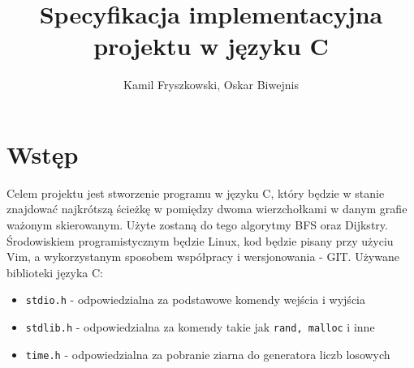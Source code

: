 \documentclass{article}
\title{Specyfikacja implementacyjna projektu w języku C}
\author{Kamil Fryszkowski, Oskar Biwejnis}
\begin{document}
\maketitle
\thispagestyle{fancy}
\section{Wstęp}
Celem projektu jest stworzenie programu w języku C, który będzie w stanie znajdować najkrótszą ścieżkę w pomiędzy dwoma wierzchołkami w danym grafie ważonym skierowanym. Użyte zostaną do tego algorytmy BFS oraz Dijkstry. Środowiskiem programistycznym będzie Linux, kod będzie pisany przy użyciu Vim, a wykorzystanym sposobem współpracy i wersjonowania - GIT.
Używane biblioteki języka C:
\begin{itemize}
\item \texttt{\footnotesize stdio.h} - odpowiedzialna za podstawowe komendy wejścia i wyjścia


\item \texttt{\footnotesize stdlib.h} - odpowiedzialna za komendy takie jak \texttt{\footnotesize rand, malloc} i inne


\item \texttt{\footnotesize time.h} - odpowiedzialna za pobranie ziarna do generatora liczb losowych
\end{itemize}
\end{document}

